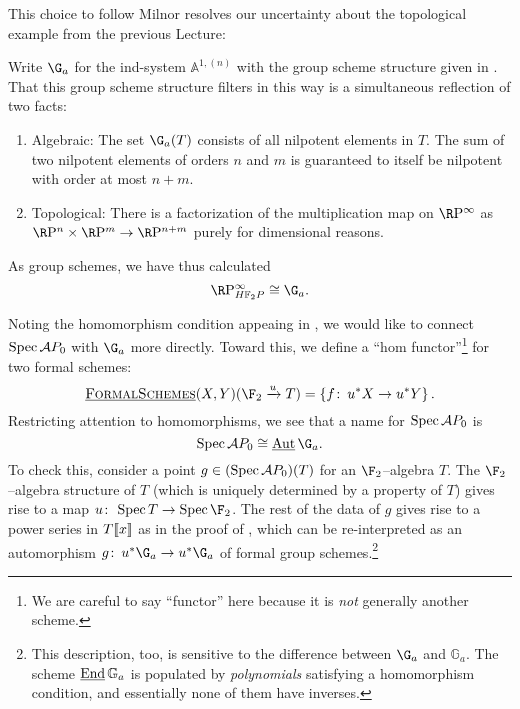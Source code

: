 This choice to follow Milnor resolves our uncertainty about the topological example from the previous Lecture:
\begin{example}\label{RPinftyExampleForReal}
Write \(\G_a\) for the ind-system \(\mathbb A^{1, (n)}\) with the group scheme structure given in .  That this group scheme structure filters in this way is a simultaneous reflection of two facts:
\begin{enumerate}
\item Algebraic: The set \(\G_a(T)\) consists of all nilpotent elements in \(T\).  The sum of two nilpotent elements of orders \(n\) and \(m\) is guaranteed to itself be nilpotent with order at most \(n+m\).
\item Topological: There is a factorization of the multiplication map on \(\RP^\infty\) as \(\RP^n \times \RP^m \to \RP^{n+m}\) purely for dimensional reasons.
\end{enumerate}
As group schemes, we have thus calculated \[\RP^\infty_{\HFtwo P} \cong \G_a.\]
\end{example}

\begin{example}\label{FirstAppearanceOfInternalAut}
Noting the homomorphism condition appeaing in , we would like to connect \(\operatorname{Spec} \mathcal AP_0\) with \(\G_a\) more directly.  Toward this, we define a ``hom functor''\footnote{We are careful to say ``functor'' here because it is \emph{not} generally another scheme.} for two formal schemes: \[\InternalHom{FormalSchemes}(X, Y)(\F_2 \xrightarrow{u} T) = \left\{ f\co u^* X \to u^* Y \right\}.\]  Restricting attention to homomorphisms, we see that a name for \(\operatorname{Spec} \mathcal AP_0\) is \[\Spec \mathcal AP_0 \cong \InternalAut \G_a.\]  To check this, consider a point \(g \in (\operatorname{Spec} \mathcal AP_0)(T)\) for an \(\F_2\)--algebra \(T\).  The \(\F_2\)--algebra structure of \(T\) (which is uniquely determined by a property of \(T\)) gives rise to a map \(u\co \Spec T \to \Spec \F_2\).  The rest of the data of \(g\) gives rise to a power series in \(T\llbracket{x}\rrbracket\) as in the proof of , which can be re-interpreted as an automorphism \(g\co u^* \G_a \to u^* \G_a\) of formal group schemes.\footnote{This description, too, is sensitive to the difference between \(\G_a\) and \(\mathbb G_a\).  The scheme \(\operatorname{\underline{\smash{\operatorname{End}}}} \mathbb G_a\) is populated by \emph{polynomials} satisfying a homomorphism condition, and essentially none of them have inverses.}
\end{example}

